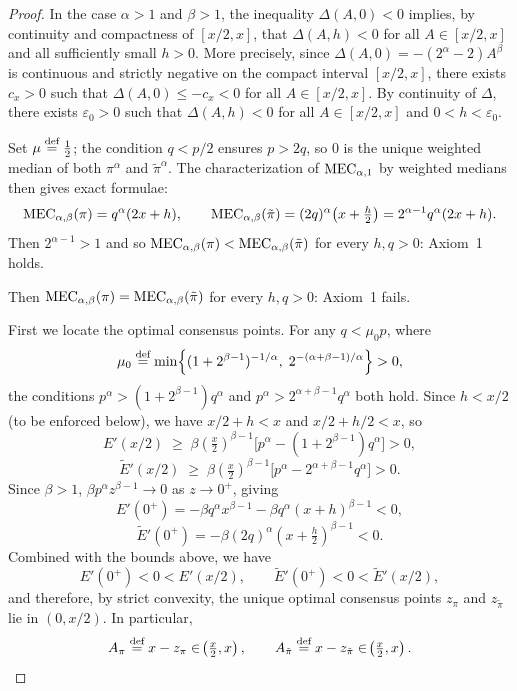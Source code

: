 \begin{proof}
In the case $\alpha>1$ and $\beta>1$, the inequality $\Delta(A,0)<0$ implies, by continuity and compactness of $[x/2,x]$, that $\Delta(A,h)<0$ for all $A\in[x/2,x]$ and all sufficiently small $h>0$. More precisely, since $\Delta(A,0)=-(2^\alpha-2)A^\beta$ is continuous and strictly negative on the compact interval $[x/2,x]$, there exists $c_x>0$ such that $\Delta(A,0)\le -c_x<0$ for all $A\in[x/2,x]$. By continuity of $\Delta$, there exists $\varepsilon_0>0$ such that $\Delta(A,h)<0$ for all $A\in[x/2,x]$ and $0<h<\varepsilon_0$.

Set $\mu\stackrel{\text{def}}{=}\tfrac12$; the condition $q<p/2$ ensures $p>2q$, so $0$ is
the unique weighted median of both $\pi^\alpha$ and $\tilde\pi^\alpha$.
The characterization of $\MEC[\alpha,1]$ by weighted medians then gives exact formulae:
\[
  \MEC(\pi)=q^\alpha(2x+h),
  \qquad
  \MEC(\tilde\pi)=(2q)^\alpha\!\left(x+\tfrac{h}{2}\right)=2^{\alpha-1}q^\alpha(2x+h).
\]
 Then $2^{\alpha-1}>1$ and so $\MEC(\pi)<\MEC(\tilde\pi)$ for every
$h,q>0$: Axiom~1 holds.

 Then $\MEC(\pi)=\MEC(\tilde\pi)$ for every $h,q>0$: Axiom~1 fails.

 First we locate the optimal consensus points.
For any $q<\mu_0 p$, where
\[
  \mu_0\stackrel{\text{def}}{=}\min\!\left\{(1+2^{\beta-1})^{-1/\alpha},\;2^{-(\alpha+\beta-1)/\alpha}\right\}>0,
\]
the conditions $p^\alpha>(1+2^{\beta-1})q^\alpha$ and $p^\alpha>2^{\alpha+\beta-1}q^\alpha$
both hold. Since $h<x/2$ (to be enforced below), we have
$x/2+h<x$ and $x/2+h/2<x$, so
\[
  E'(x/2)
  \;\geq\;
  \beta\!\left(\tfrac x2\right)^{\!\beta-1}\!\!\bigl[p^\alpha-(1+2^{\beta-1})q^\alpha\bigr]>0,
\]
\[
  \widetilde{E}'(x/2)
  \;\geq\;
  \beta\!\left(\tfrac x2\right)^{\!\beta-1}\!\!\bigl[p^\alpha-2^{\alpha+\beta-1}q^\alpha\bigr]>0.
\]
Since $\beta>1$, $\beta p^\alpha z^{\beta-1}\to 0$ as $z\to 0^+$, giving
\[
  E'(0^+)=-\beta q^\alpha x^{\beta-1}-\beta q^\alpha(x+h)^{\beta-1}<0,
\]
\[
  \widetilde{E}'(0^+)=-\beta(2q)^\alpha\!\left(x+\tfrac{h}{2}\right)^{\beta-1}<0.
\]
Combined with the bounds above, we have
\[
  E'(0^+)<0<E'(x/2),
  \qquad
  \widetilde{E}'(0^+)<0<\widetilde{E}'(x/2),
\]
and therefore, by strict convexity, the unique optimal consensus points $z_\pi$ and $z_{\tilde\pi}$ lie in $(0,x/2)$. In particular,
\[
  A_\pi\stackrel{\text{def}}{=} x-z_\pi\in\!\left(\tfrac x2,x\right),
  \qquad
  A_{\tilde\pi}\stackrel{\text{def}}{=} x-z_{\tilde\pi}\in\!\left(\tfrac x2,x\right).
\]


\end{proof}
